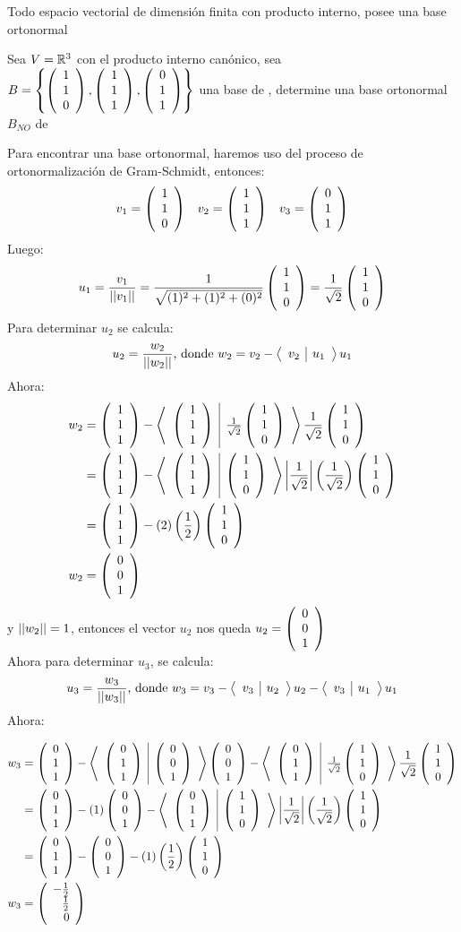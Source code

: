 \begin{theorem}[corolario]
    Todo espacio vectorial de dimensión finita con producto interno, posee una base ortonormal
\end{theorem}

\begin{ejemplo}
    Sea $V = \rtres$ con el producto interno canónico, sea $B = \llav{\vectrtres{1}{1}{0}, \vectrtres{1}{1}{1},\vectrtres{0}{1}{1}}$ una base de \rtres, determine una base ortonormal $B_{NO}$ de \rtres
\end{ejemplo}
\begin{sol}
Para encontrar una base ortonormal, haremos uso del proceso de ortonormalización de Gram-Schmidt, entonces:
\begin{align*}
    v_1 = \vectrtres{1}{1}{0} && v_2 = \vectrtres{1}{1}{1} && v_3 = \vectrtres{0}{1}{1}
\end{align*}
Luego: 
$$u_1 = \frac{v_1}{\norm{v_1}} = \frac{1}{\sqrt{(1)^2 + (1)^2 + (0)^2}}\vectrtres{1}{1}{0} = \frac{1}{\sqrt{2}} \vectrtres{1}{1}{0}$$
Para determinar $u_2$ se calcula:
$$u_2 = \frac{w_2}{\norm{w_2}} \text{, donde $w_2 = v_2 - \prodInt{v_2}{u_1}u_1$}$$
Ahora:
\begin{align*}
    w_2 &= \vectrtres{1}{1}{1} - \prodInt{\vectrtres{1}{1}{1}}{\frac{1}{\sqrt{2}}\vectrtres{1}{1}{0}}\frac{1}{\sqrt{2}}\vectrtres{1}{1}{0}\\
    &= \vectrtres{1}{1}{1} - \prodInt{\vectrtres{1}{1}{1}}{\vectrtres{1}{1}{0}}\left|\frac{1}{\sqrt{2}}\right|\left(\frac{1}{\sqrt{2}}\right) \vectrtres{1}{1}{0}\\
    &= \vectrtres{1}{1}{1} - (2)\left(\frac{1}{2}\right)\vectrtres{1}{1}{0}\\
    w_2 &= \vectrtres{0}{0}{1}
\end{align*}
y $\norm{w_2} = 1$, entonces el vector $u_2$ nos queda $u_2 = \vectrtres{0}{0}{1}$\\
Ahora para determinar $u_3$, se calcula:
$$u_3 = \frac{w_3}{\norm{w_3}} \text{, donde $w_3 = v_3 - \prodInt{v_3}{u_2}u_2 - \prodInt{v_3}{u_1}u_1$}$$
Ahora:

\begin{align*}
    w_3 &= \vectrtres{0}{1}{1} - \prodInt{\vectrtres{0}{1}{1}}{\vectrtres{0}{0}{1}}\vectrtres{0}{0}{1} - \prodInt{\vectrtres{0}{1}{1}}{\frac{1}{\sqrt{2}}\vectrtres{1}{1}{0}}\frac{1}{\sqrt{2}}\vectrtres{1}{1}{0}\\
    &= \vectrtres{0}{1}{1} - (1)\vectrtres{0}{0}{1} - \prodInt{\vectrtres{0}{1}{1}}{\vectrtres{1}{1}{0}} \left|\frac{1}{\sqrt{2}}\right|\left(\frac{1}{\sqrt{2}}\right)\vectrtres{1}{1}{0}\\
    &= \vectrtres{0}{1}{1} - \vectrtres{0}{0}{1} - (1)\left(\frac{1}{2}\right)\vectrtres{1}{1}{0}\\
    w_3 &= \vectrtres{-\frac{1}{2}}{\frac{1}{2}}{0}
\end{align*}


\end{sol}
